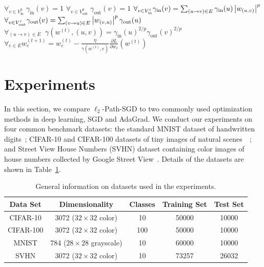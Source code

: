\documentclass[11pt]{article}
\newcommand{\IN}{\text{in}}
\newcommand{\OUT}{\text{out}}
\newcommand{\RSGD}{Path-SGD }
\begin{document}
\begin{algorithm}[t]
  \caption{\RSGD update rule}\label{alg:update}
  \begin{algorithmic}[1]
  \State $\forall_{v\in V^0_{\IN}}\; \gamma_{\IN}(v)=1$
  \State $\forall_{v\in V^0_\OUT}\; \gamma_{\OUT}(v)=1$
  \State $\forall_{v\in V^i_{\IN}} \gamma_{\IN}(v) = \sum_{(u\rightarrow v)\in E} \gamma_{\IN}(u)\abs{w_{(u,v)}}^p$
  \State $\forall_{v\in V^i_{\OUT}} \gamma_{\OUT}(v) = \sum_{(v\rightarrow u)\in E} \abs{w_{(v,u)}}^p\gamma_{\OUT}(u)$
  \EndFor
  \State $\forall_{(u\rightarrow v)\in E}\;\; \gamma(w^{(t)},(u,v)) = \gamma_{\IN}(u)^{2/p}\gamma_{\OUT}(v)^{2/p}$
  \State $\forall_{e\in E} w^{(t+1)}_e = w^{(t)}_e - \frac{\eta}{\gamma(w^{(t)},e)} \frac{\partial L}{\partial w_e}(w^{(t)})$
   \end{algorithmic}
\end{algorithm}

\section{Experiments}
In this section, we compare $\ell_2$-\RSGD to two commonly used optimization methods in deep learning, SGD and AdaGrad. We conduct our experiments on 
four common benchmark datasets: the standard MNIST dataset of handwritten digits~\cite{lecun1998gradient}; 
CIFAR-10 and CIFAR-100 datasets of tiny images of natural scenes~~\cite{krizhevsky2009learning}; 
and Street View House Numbers (SVHN) dataset containing 
color images of house numbers collected by Google Street View~\cite{netzer2011reading}. 
Details of the datasets are shown in Table~\ref{table}.



\begin{table}[t]
\caption{General information on datasets used in the experiments.}
\label{table}
\begin{center}
\begin{tabular}{c c c c c}
{\bf Data Set}  &{\bf Dimensionality}&{\bf Classes}&{\bf Training Set}&{\bf Test Set}
\\ \hline
CIFAR-10&3072 ($32 \times 32$ color)&10&50000&10000\\
CIFAR-100&3072 ($32 \times 32$ color)&100&50000&10000\\
MNIST&784 ($28 \times 28$ grayscale)&10&60000&10000\\
SVHN&3072 ($32 \times 32$ color)&10&73257&26032\\
\hline
\end{tabular}
\end{center}
\end{table}
\end{document}
